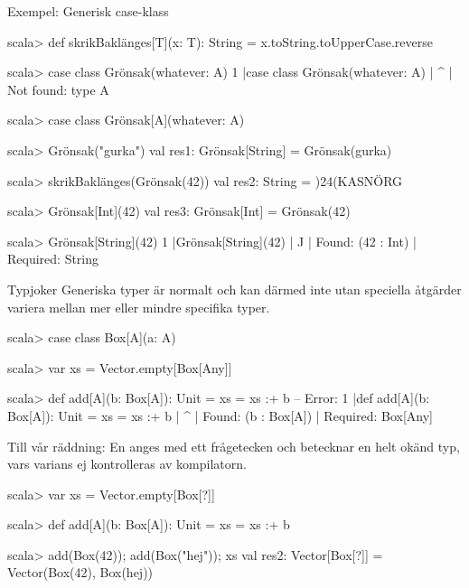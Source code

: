\begin{Slide}{Exempel: Generisk case-klass}
\vspace{-0.5em}\begin{REPL}
scala> def skrikBaklänges[T](x: T): String = x.toString.toUpperCase.reverse

scala> case class Grönsak(whatever: A)
1 |case class Grönsak(whatever: A)
  |                             ^
  |                             Not found: type A

scala> case class Grönsak[A](whatever: A)

scala> Grönsak("gurka")
val res1: Grönsak[String] = Grönsak(gurka)

scala> skrikBaklänges(Grönsak(42))
val res2: String = )24(KASNÖRG

scala> Grönsak[Int](42)
val res3: Grönsak[Int] = Grönsak(42)

scala> Grönsak[String](42)
1 |Grönsak[String](42)
  |                ^^
  |                Found:    (42 : Int)
  |                Required: String

\end{REPL}
\end{Slide}


\begin{Slide}{Typjoker }\SlideFontSmall
Generiska typer är normalt  och kan därmed inte utan speciella åtgärder variera mellan mer eller mindre specifika typer. %
\begin{REPLsmall}
scala> case class Box[A](a: A)

scala> var xs = Vector.empty[Box[Any]]

scala> def add[A](b: Box[A]): Unit = xs = xs :+ b
-- Error:
1 |def add[A](b: Box[A]): Unit = xs = xs :+ b
  |                                         ^
  |                                         Found:    (b : Box[A])
  |                                         Required: Box[Any]
\end{REPLsmall}  
Till vår räddning: En   anges med ett frågetecken och betecknar en helt okänd typ, vars varians ej kontrolleras av kompilatorn.
\begin{REPLsmall}
scala> var xs = Vector.empty[Box[?]]

scala> def add[A](b: Box[A]): Unit = xs = xs :+ b

scala> add(Box(42)); add(Box("hej")); xs
val res2: Vector[Box[?]] = Vector(Box(42), Box(hej))
\end{REPLsmall}
\end{Slide}


